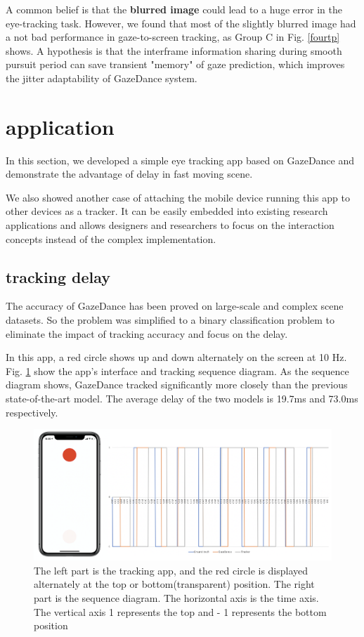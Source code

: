 \documentclass[acmlarge]{acmart}
\begin{document}
A common belief is that the \textbf{blurred image} could lead to a huge error in the eye-tracking task. However, we found that most of the slightly blurred image had a not bad performance in gaze-to-screen tracking, as Group C in Fig. \ref{fourtp} shows. A hypothesis is that the interframe information sharing during smooth pursuit period can save transient "memory" of gaze prediction, which improves the jitter adaptability of GazeDance system.

\section{application}

In this section, we developed a simple eye tracking app based on GazeDance and demonstrate the advantage of delay in fast moving scene.

We also showed another case of attaching the mobile device running this app to other devices as a tracker. It can be easily embedded into existing research applications and allows designers and researchers to focus on the interaction concepts instead of the complex implementation.

\subsection{tracking delay}

The accuracy of GazeDance has been proved on large-scale and complex scene datasets. So the problem was simplified to a binary classification problem to eliminate the impact of tracking accuracy and focus on the delay.

In this app, a red circle shows up and down alternately on the screen at 10 Hz. Fig. \ref{fig:diagram} show the app's interface and tracking sequence diagram. As the sequence diagram shows, GazeDance tracked significantly more closely than the previous state-of-the-art model. The average delay of the two models is 19.7ms and 73.0ms respectively.

\begin{figure} 
  \centering
  \includegraphics[scale=0.5]{pictures/device&diagram.png}
  \caption{The left part is the tracking app, and the red circle is displayed alternately at the top or bottom(transparent) position. The right part is the sequence diagram. The horizontal axis is the time axis. The vertical axis 1 represents the top and - 1 represents the bottom position}
  \Description{}
  \label{fig:diagram}
\end{figure}
\end{document}
